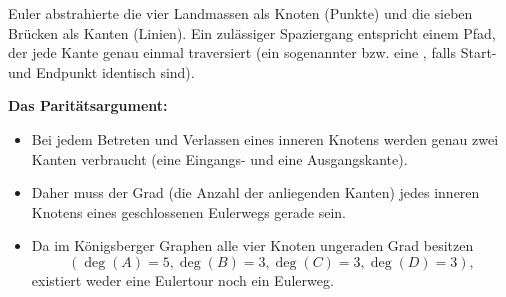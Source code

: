 \begin{math-stroke}
\begin{ai-tikz-planner-invisible-content}
\end{ai-tikz-planner-invisible-content}
\begin{center}
\end{center}

\begin{explanation-of-steps}
Euler abstrahierte die vier Landmassen als Knoten (Punkte) und die sieben Brücken als Kanten (Linien). Ein zulässiger Spaziergang entspricht einem Pfad, der jede Kante genau einmal traversiert (ein sogenannter  bzw. eine , falls Start- und Endpunkt identisch sind).

\textbf{Das Paritätsargument:}
\begin{itemize}
    \item Bei jedem Betreten und Verlassen eines inneren Knotens werden genau zwei Kanten verbraucht (eine Eingangs- und eine Ausgangskante).
    \item Daher muss der Grad (die Anzahl der anliegenden Kanten) jedes inneren Knotens eines geschlossenen Eulerwegs gerade sein.
    \item Da im Königsberger Graphen alle vier Knoten ungeraden Grad besitzen 
    \[(\deg(A)=5, \deg(B)=3, \deg(C)=3, \deg(D)=3),\] 
    existiert weder eine Eulertour noch ein Eulerweg.
\end{itemize}
\end{explanation-of-steps}
\end{math-stroke}


